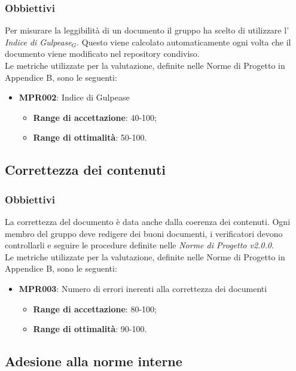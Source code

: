 \subsubsection{Obbiettivi}
Per misurare la leggibilità di un documento il gruppo ha scelto di utilizzare l' \textit{Indice di Gulpease$_{G}$}. Questo viene calcolato automaticamente ogni volta che il documento viene modificato nel repository condiviso.\\
Le metriche utilizzate per la valutazione, definite nelle Norme di Progetto in Appendice B, sono le seguenti:
\begin{itemize}
	\item \textbf{MPR002}: Indice di Gulpease
	\begin{itemize}
		\item \textbf{Range di accettazione}: 40-100;
		\item \textbf{Range di ottimalità}: 50-100.
	\end{itemize}
\end{itemize}
\subsection{Correttezza dei contenuti}
\subsubsection{Obbiettivi}
La correttezza del documento è data anche dalla coerenza dei contenuti. Ogni membro del gruppo deve redigere dei buoni documenti, i verificatori devono controllarli e seguire le procedure definite nelle \textit{Norme di Progetto v2.0.0}.\\
Le metriche utilizzate per la valutazione, definite nelle Norme di Progetto in Appendice B, sono le seguenti:
\begin{itemize}
	\item \textbf{MPR003}: Numero di errori inerenti alla correttezza dei documenti
	\begin{itemize}
		\item \textbf{Range di accettazione}: 80-100;
		\item \textbf{Range di ottimalità}: 90-100.
	\end{itemize}
\end{itemize}
\subsection{Adesione alla norme interne}
